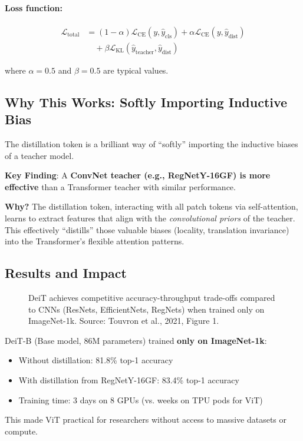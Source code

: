 \documentclass{article}
\begin{document}
\paragraph{Loss function:}
\begin{align}
\mathcal{L}_{\text{total}} &= (1-\alpha) \mathcal{L}_{\text{CE}}(y, \hat{y}_{\text{cls}}) + \alpha \mathcal{L}_{\text{CE}}(y, \hat{y}_{\text{dist}}) \nonumber \\
&\quad + \beta \mathcal{L}_{\text{KL}}(\hat{y}_{\text{teacher}}, \hat{y}_{\text{dist}})
\end{align}

where $\alpha = 0.5$ and $\beta = 0.5$ are typical values.

\subsection{Why This Works: Softly Importing Inductive Bias}

The distillation token is a brilliant way of ``softly'' importing the inductive biases of a teacher model.

\textbf{Key Finding}: A \textbf{ConvNet teacher (e.g., RegNetY-16GF) is more effective} than a Transformer teacher with similar performance.

\textbf{Why?} The distillation token, interacting with all patch tokens via self-attention, learns to extract features that align with the \textit{convolutional priors} of the teacher. This effectively ``distills'' those valuable biases (locality, translation invariance) into the Transformer's flexible attention patterns.

\subsection{Results and Impact}

\begin{figure}[h]
\centering
{}
\caption{DeiT achieves competitive accuracy-throughput trade-offs compared to CNNs (ResNets, EfficientNets, RegNets) when trained only on ImageNet-1k. Source: Touvron et al., 2021, Figure 1.}
\end{figure}

\begin{tcolorbox}[colback=yellow!5!white, colframe=orange!50!black, title=DeiT Results on ImageNet-1k]
DeiT-B (Base model, 86M parameters) trained \textbf{only on ImageNet-1k}:
\begin{itemize}
\item Without distillation: 81.8\% top-1 accuracy
\item With distillation from RegNetY-16GF: 83.4\% top-1 accuracy
\item Training time: 3 days on 8 GPUs (vs. weeks on TPU pods for ViT)
\end{itemize}

This made ViT practical for researchers without access to massive datasets or compute.
\end{tcolorbox}
\end{document}

